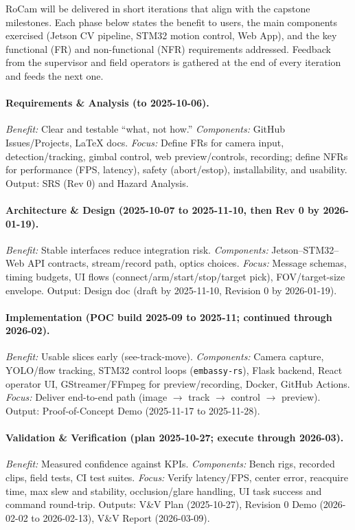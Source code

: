 \documentclass[12pt]{article}
\begin{document}
RoCam will be delivered in short iterations that align with the capstone
milestones. Each phase below states the benefit to users, the main components
exercised (Jetson CV pipeline, STM32 motion control, Web App), and the key
functional (FR) and non-functional (NFR) requirements addressed. Feedback from
the supervisor and field operators is gathered at the end of every iteration
and feeds the next one.

\paragraph{Requirements \& Analysis (to 2025-10-06).}
\emph{Benefit:} Clear and testable “what, not how.”
\emph{Components:} GitHub Issues/Projects, LaTeX docs.
\emph{Focus:} Define FRs for camera input, detection/tracking, gimbal control, web preview/controls, recording; define NFRs for performance (FPS, latency), safety (abort/estop), installability, and usability. Output: SRS (Rev 0) and Hazard Analysis.

\paragraph{Architecture \& Design (2025-10-07 to 2025-11-10, then Rev 0 by 2026-01-19).}
\emph{Benefit:} Stable interfaces reduce integration risk.
\emph{Components:} Jetson–STM32–Web API contracts, stream/record path, optics choices.
\emph{Focus:} Message schemas, timing budgets, UI flows (connect/arm/start/stop/target pick), FOV/target-size envelope. Output: Design doc (draft by 2025-11-10, Revision 0 by 2026-01-19).

\paragraph{Implementation (POC build 2025-09 to 2025-11; continued through 2026-02).}
\emph{Benefit:} Usable slices early (see-track-move).
\emph{Components:} Camera capture, YOLO/flow tracking, STM32 control loops (\texttt{embassy-rs}), Flask backend, React operator UI, GStreamer/FFmpeg for preview/recording, Docker, GitHub Actions.
\emph{Focus:} Deliver end-to-end path (image $\rightarrow$ track $\rightarrow$ control $\rightarrow$ preview). Output: Proof-of-Concept Demo (2025-11-17 to 2025-11-28).

\paragraph{Validation \& Verification (plan 2025-10-27; execute through 2026-03).}
\emph{Benefit:} Measured confidence against KPIs.
\emph{Components:} Bench rigs, recorded clips, field tests, CI test suites.
\emph{Focus:} Verify latency/FPS, center error, reacquire time, max slew and stability, occlusion/glare handling, UI task success and command round-trip. Outputs: V\&V Plan (2025-10-27), Revision 0 Demo (2026-02-02 to 2026-02-13), V\&V Report (2026-03-09).
\end{document}
